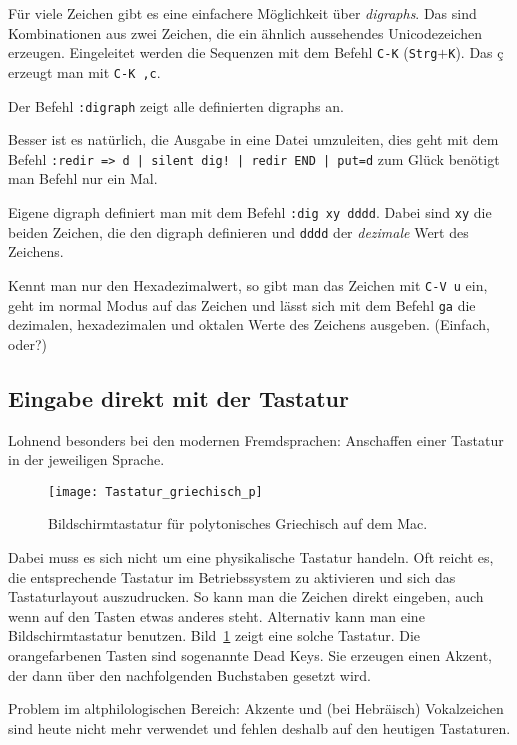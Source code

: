 Für viele Zeichen gibt es eine einfachere Möglichkeit über \emph{digraphs}.
Das sind Kombinationen aus zwei Zeichen, die ein ähnlich aussehendes Unicodezeichen erzeugen.
Eingeleitet werden die Sequenzen mit dem Befehl \lstinline/C-K/ (\texttt{Strg}$+$\texttt{K}).
Das ç erzeugt man mit \lstinline/C-K ,c/.

Der Befehl \lstinline/:digraph/ zeigt alle definierten digraphs an.

Besser ist es natürlich, die Ausgabe in eine Datei umzuleiten, dies geht mit dem Befehl
\lstinline/:redir => d | silent dig! | redir END | put=d/
zum Glück benötigt man Befehl nur ein Mal.

Eigene digraph definiert man mit dem Befehl \lstinline/:dig xy dddd/.
Dabei sind \lstinline/xy/ die beiden Zeichen, die den digraph definieren und \lstinline/dddd/
der \emph{dezimale} Wert des Zeichens.

Kennt man nur den Hexadezimalwert, so gibt man das Zeichen mit \lstinline/C-V u/ ein,
geht im normal Modus auf das Zeichen und lässt sich mit dem Befehl \lstinline/ga/ die
dezimalen, hexadezimalen und oktalen Werte des Zeichens ausgeben.
(Einfach, oder?)

\subsection{Eingabe direkt mit der Tastatur}

Lohnend besonders bei den modernen Fremdsprachen: Anschaffen einer Tastatur in der jeweiligen
Sprache.

\begin{figure}
 \texttt{[image: Tastatur\_griechisch\_p]}
 \caption{Bildschirmtastatur für polytonisches Griechisch auf dem Mac.}
 \label{fig:tastatur-griechisch}
\end{figure}

Dabei muss es sich nicht um eine physikalische Tastatur handeln.
Oft reicht es, die entsprechende Tastatur im Betriebssystem zu aktivieren und sich das
Tastaturlayout auszudrucken.
So kann man die Zeichen direkt eingeben, auch wenn auf den Tasten etwas anderes steht.
Alternativ kann man eine Bildschirmtastatur benutzen. Bild~\ref{fig:tastatur-griechisch} zeigt
eine solche Tastatur. Die orangefarbenen Tasten sind sogenannte Dead Keys. Sie erzeugen einen Akzent,
der dann über den nachfolgenden Buchstaben gesetzt wird.

Problem im altphilologischen Bereich: Akzente und (bei Hebräisch) Vokalzeichen sind heute
nicht mehr verwendet und fehlen deshalb auf den heutigen Tastaturen.

